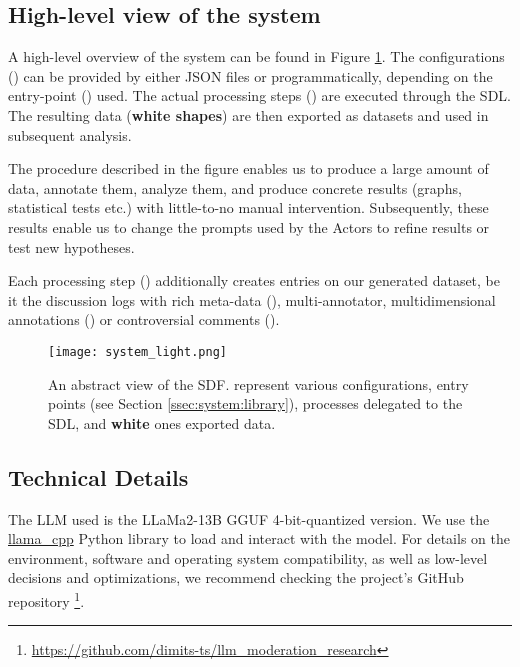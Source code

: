 \subsection{High-level view of the system}
\label{ssec:system:overview}

A high-level overview of the system can be found in Figure \ref{fig::system}. The configurations () can be provided by either \ac{JSON} files or programmatically, depending on the entry-point () used. The actual processing steps () are executed through the \ac{SDL}. The resulting data (\textbf{white shapes}) are then exported as datasets and used in subsequent analysis.

The procedure described in the figure enables us to produce a large amount of data, annotate them, analyze them, and produce concrete results (graphs, statistical tests etc.) with little-to-no manual intervention. Subsequently, these results enable us to change the prompts used by the Actors to refine results or test new hypotheses.

Each processing step () additionally creates entries on our generated dataset, be it the discussion logs with rich meta-data (), multi-annotator, multidimensional annotations () or controversial comments ().

\begin{figure}
	\centering
	\texttt{[image: system\_light.png]}
	\caption{An abstract view of the \ac{SDF}.  represent various configurations,  entry points (see Section \ref{ssec:system:library}),  processes delegated to the \ac{SDL}, and \textbf{white} ones exported data.}
	\label{fig::system}
\end{figure}



\subsection{Technical Details}
\label{ssec:system:details}

The LLM used is the LLaMa2-13B GGUF 4-bit-quantized version. We use the \href{https://github.com/abetlen/llama-cpp-python}{llama\_cpp} Python library to load and interact with the model. For details on the environment, software and operating system compatibility, as well as low-level decisions and optimizations, we recommend checking the project's GitHub repository \footnote{\url{https://github.com/dimits-ts/llm_moderation_research}}.

